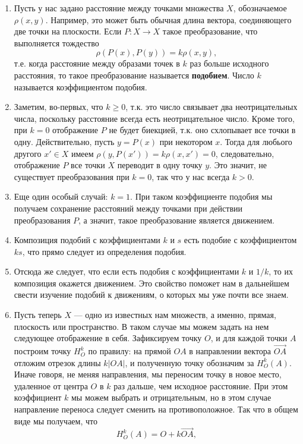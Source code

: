 \begin{enumerate}

\item Пусть у нас задано расстояние между точками множества $X$, обозначаемое $\rho(x,y)$. Например, это может быть обычная длина вектора, соединяющего две точки на плоскости. Если $P:X\to X$ такое преобразование, что выполняется тождество
$$
\rho(P(x),P(y)) = k\rho(x,y),
$$
т.е. когда расстояние между образами точек в $k$ раз больше исходного расстояния, то такое преобразование называется \textbf{подобием}. Число $k$ называется коэффициентом подобия.
\item Заметим, во-первых, что $k\ge 0$, т.к. это число связывает два неотрицательных числа, поскольку расстояние всегда есть неотрицательное число. Кроме того, при $k=0$ отображение $P$ не будет биекцией, т.к. оно схлопывает все точки в одну. Действительно, пусть $y=P(x)$ при некотором $x$. Тогда для любього другого $x'\in X$ имеем $\rho(y,P(x'))=k\rho(x,x')=0$, следовательно, отображение $P$ все точки $X$ переводит в одну точку $y$. Это значит, не существует преобразования при $k=0$, так что у нас всегда $k>0$.
\item Еще один особый случай: $k=1$. При таком коэффициенте подобия мы получаем сохранение расстояний между точками при действии преобразования $P$, а значит, такое преобразование является движением.
\item Композиция подобий с коэффициентами $k$ и $s$ есть подобие с коэффициентом $ks$, что прямо следует из определения подобия.
\item Отсюда же следует, что если есть подобия с коэффициентами $k$ и $1/k$, то их композиция окажется движением. Это свойство поможет нам в дальнейшем свести изучение подобий к движениям, о которых мы уже почти все знаем.
\item Пусть теперь $X$ --- одно из известных нам множеств, а именно, прямая, плоскость или пространство. В таком случае мы можем задать на нем следующее отображение в себя. Зафиксируем точку $O$, и для каждой точки $A$ построим точку $H_O^k$ по правилу: на прямой $OA$ в направлении вектора $\vec{OA}$ отложим отрезок длины $k|OA|$, и полученную точку обозначим за $H_O^k(A)$. Иначе говоря, не меняя направления, мы переносим точку в новое место, удаленное от центра $O$ в $k$ раз дальше, чем исходное расстояние. При этом коэффициент $k$ мы можем выбрать и отрицательным, но в этом случае направление переноса следует сменить на противоположное. Так что в общем виде мы получаем, что 
$$
H_O^k(A) = O + k\vec{OA},
$$
\end{enumerate}
